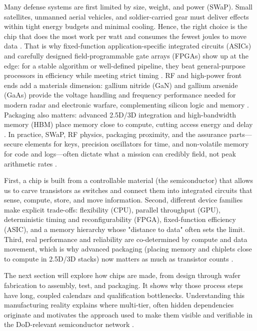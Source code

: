 Many defense systems are first limited by size, weight, and power (SWaP). Small satellites, unmanned aerial vehicles, and soldier-carried gear must deliver effects within tight energy budgets and minimal cooling. Hence, the right choice is the chip that does the most work per watt and consumes the fewest joules to move data \parencite{patterson_computer_2018}. That is why fixed-function application-specific integrated circuits (ASICs) and carefully designed field-programmable gate arrays (FPGAs) show up at the edge: for a stable algorithm or well-defined pipeline, they beat general-purpose processors in efficiency while meeting strict timing \parencite{kuon_measuring_2006,hauck_reconfigurable_2008}. RF and high-power front ends add a materials dimension: gallium nitride (GaN) and gallium arsenide (GaAs) provide the voltage handling and frequency performance needed for modern radar and electronic warfare, complementing silicon logic and memory \parencite{baliga_fundamentals_2019,morkoc_handbook_2008, razavi_rf_1998}. Packaging also matters: advanced 2.5D/3D integration and high-bandwidth memory (HBM) place memory close to compute, cutting access energy and delay \parencite{ieee_electronics_packaging_society_heterogeneous_2024, jedec_jesd238_hbm3_2022}. In practice, SWaP, RF physics, packaging proximity, and the assurance parts---secure elements for keys, precision oscillators for time, and non-volatile memory for code and logs---often dictate what a mission can credibly field, not peak arithmetic rates \parencite{razavi_fundamentals_2008,us_department_of_commerce_defense_2009}.

First, a chip is built from a controllable material (the semiconductor) that allows us to carve transistors as switches and connect them into integrated circuits that sense, compute, store, and move information. Second, different device families make explicit trade-offs: flexibility (CPU), parallel throughput (GPU), deterministic timing and reconfigurability (FPGA), fixed-function efficiency (ASIC), and a memory hierarchy whose "distance to data" often sets the limit. Third, real performance and reliability are co-determined by compute and data movement, which is why advanced packaging (placing memory and chiplets close to compute in 2.5D/3D stacks) now matters as much as transistor counts \parencite{ieee_electronics_packaging_society_heterogeneous_2024}.

The next section will explore how chips are made, from design through wafer fabrication to assembly, test, and packaging. It shows why those process steps have long, coupled calendars and qualification bottlenecks. Understanding this manufacturing reality explains where multi-tier, often hidden dependencies originate and motivates the approach used to make them visible and verifiable in the DoD-relevant semiconductor network \parencite{national_science_and_technology_council_national_2024,us_department_of_commerce_defense_2009}.

